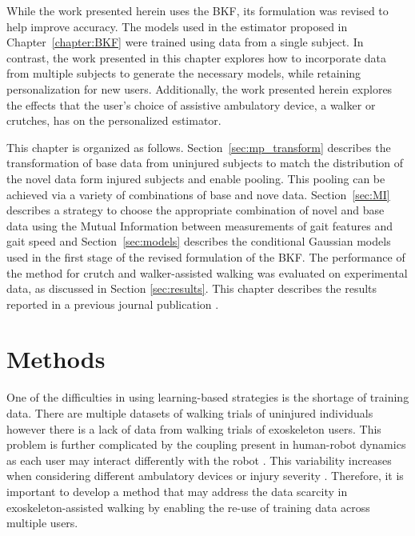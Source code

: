 While the work presented herein uses the BKF, its formulation was revised to help improve accuracy. The models used in the estimator proposed in Chapter~\ref{chapter:BKF} were trained using data from a single subject. In contrast, the work presented in this chapter explores how to incorporate data from multiple subjects to generate the necessary models, while retaining personalization for new users. Additionally, the work presented herein explores the effects that the user's choice of assistive ambulatory device, a walker or crutches, has on the personalized estimator.

This chapter is organized as follows. Section~\ref{sec:mp_transform} describes the transformation of base data from uninjured subjects to match the distribution of the novel data form injured subjects and enable pooling. This pooling can be achieved via a variety of combinations of base and nove data. Section~\ref{sec:MI} describes a strategy to choose the appropriate combination of novel and base data using the Mutual Information between measurements of gait features and gait speed and Section~\ref{sec:models} describes the conditional Gaussian models used in the first stage of the revised formulation of the BKF. The performance of the method for crutch and walker-assisted walking was evaluated on experimental data, as discussed in Section \ref{sec:results}. This chapter describes the results reported in a previous journal publication \cite{karulkar2022personalized}.

\section{Methods} 
One of the difficulties in using learning-based strategies is the shortage of training data. There are multiple datasets of walking trials of uninjured individuals \cite{hu2018benchmark,anguita2013public,fukuchi2018public} however there is a lack of data from walking trials of exoskeleton users. This problem is further complicated by the coupling present in human-robot dynamics as each user may interact differently with the robot \cite{sylla2014assessing}. This variability increases when considering different ambulatory devices \cite{gambon2019characterizing} or injury severity \cite{gambon2020effects, rota2011walk}. Therefore, it is important to develop a method that may address the data scarcity in exoskeleton-assisted walking by enabling the re-use of training data across multiple users.

